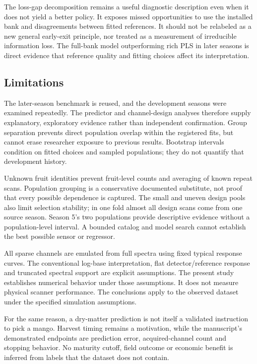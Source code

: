 \documentclass[Review,sagev,times]{sagej}
\begin{document}
The loss-gap decomposition remains a useful diagnostic description even when it does not yield a better policy. It exposes missed opportunities to use the installed bank and disagreements between fitted references. It should not be relabeled as a new general early-exit principle, nor treated as a measurement of irreducible information loss. The full-bank model outperforming rich PLS in later seasons is direct evidence that reference quality and fitting choices affect its interpretation.

\subsection{Limitations}
The later-season benchmark is reused, and the development seasons were examined repeatedly. The predictor and channel-design analyses therefore supply explanatory, exploratory evidence rather than independent confirmation. Group separation prevents direct population overlap within the registered fits, but cannot erase researcher exposure to previous results. Bootstrap intervals condition on fitted choices and sampled populations; they do not quantify that development history.

Unknown fruit identities prevent fruit-level counts and averaging of known repeat scans. Population grouping is a conservative documented substitute, not proof that every possible dependence is captured. The small and uneven design pools also limit selection stability; in one fold almost all design scans come from one source season. Season 5's two populations provide descriptive evidence without a population-level interval. A bounded catalog and model search cannot establish the best possible sensor or regressor.

All sparse channels are emulated from full spectra using fixed typical response curves. The conventional log-base interpretation, flat detector/reference response and truncated spectral support are explicit assumptions. The present study establishes numerical behavior under those assumptions. It does not measure physical scanner performance. The conclusions apply to the observed dataset under the specified simulation assumptions.

For the same reason, a dry-matter prediction is not itself a validated instruction to pick a mango. Harvest timing remains a motivation, while the manuscript's demonstrated endpoints are prediction error, acquired-channel count and stopping behavior. No maturity cutoff, field outcome or economic benefit is inferred from labels that the dataset does not contain.
\end{document}
